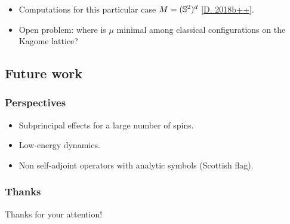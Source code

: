 \documentclass[mathserif]{beamer}
\newcommand{\mycite}[1]{{\color{mygreen} \small #1}}
\begin{document}
\begin{frame}
\begin{itemize}
  \item<2->{Computations for this particular case
    $M=(\S^2)^d$ \mycite{[\underline{D. 2018b++}]}.}

  \item<3>{{\color{myorange} Open problem}: where is $\mu$ minimal among classical
      configurations on the Kagome lattice?}
  \end{itemize}
\end{frame}

\subsection{Future work}
\begin{frame}
  \frametitle{Perspectives}
    \begin{itemize}
    \item Subprincipal effects for a large number of spins.
    \item Low-energy dynamics.
    \item Non self-adjoint operators with analytic symbols (Scottish flag).
    \end{itemize}
  \end{frame}

  \begin{frame}
    \frametitle{Thanks}
    \centering 
    {\Large Thanks for your attention!}
  \end{frame}
\end{document}

